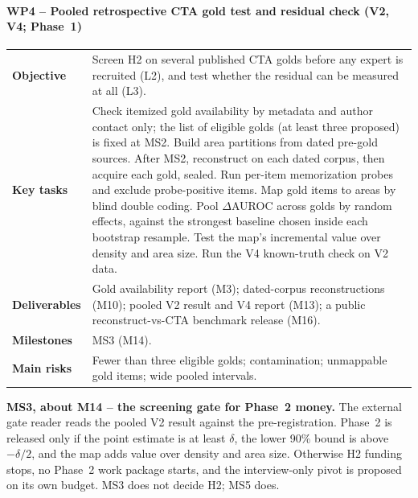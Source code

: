 \paragraph{WP4 -- Pooled retrospective CTA gold test and residual check (V2, V4; Phase~1)}
\mbox{}\par
\begin{tabularx}{\linewidth}{@{}>{\bfseries}p{2.6cm}X@{}}
  \toprule
  Objective & Screen H2 on several published CTA golds before any expert is recruited (L2), and
    test whether the residual can be measured at all (L3). \\
  Key tasks & Check itemized gold availability by metadata and author contact only; the list of
    eligible golds (at least three proposed) is fixed at MS2. Build area partitions from dated
    pre-gold sources. After MS2, reconstruct on each dated corpus, then acquire each gold,
    sealed. Run per-item memorization
    probes and exclude probe-positive items. Map gold items to areas by blind double coding. Pool
    $\Delta$AUROC across golds by random effects, against the strongest baseline chosen inside
    each bootstrap resample. Test the map's incremental value over density and area size. Run the
    V4 known-truth check on V2 data. \\
  Deliverables & Gold availability report (M3); dated-corpus reconstructions (M10); pooled V2
    result and V4 report (M13); a public reconstruct-vs-CTA benchmark release (M16). \\
  Milestones & MS3 (M14). \\
  Main risks & Fewer than three eligible golds; contamination; unmappable gold items; wide pooled
    intervals. \\
  \bottomrule
\end{tabularx}

\begin{keyquestionbox}
  \textbf{MS3, about M14 -- the screening gate for Phase~2 money.} The external gate reader reads
  the pooled V2 result against the pre-registration. Phase~2 is released only if the point
  estimate is at least $\delta$, the lower 90\% bound is above $-\delta/2$, and the map adds value
  over density and area size. Otherwise H2 funding stops, no Phase~2 work package starts, and the
  interview-only pivot is proposed on its own budget. MS3 does not decide H2; MS5 does.
\end{keyquestionbox}

